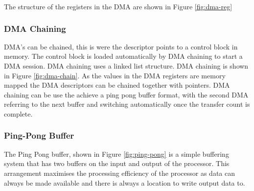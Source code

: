 \noindent The structure of the registers in the DMA are shown in Figure \ref{fig:dma-reg}



\subsubsection{DMA Chaining}
DMA's can be chained, this is were the descriptor points to a control block in memory. The control
block is loaded automatically by DMA chaining to start a DMA session. DMA chaining uses a linked
list structure. DMA chaining is shown in Figure \ref{fig:dma-chain}. As the values in the DMA
registers are memory mapped the DMA descriptors can be chained together with pointers. DMA chaining
can be use the achieve a ping pong buffer format, with the second DMA referring to the next buffer
and switching automatically once the transfer count is complete.



\subsubsection{Ping-Pong Buffer}
The Ping Pong buffer, shown in Figure \ref{fig:ping-pong} is a simple buffering system that has two
buffers on the input and output of the processor. This arrangement maximises the processing efficiency
of the processor as data can always be made available and there is always a location to write output
data to.


